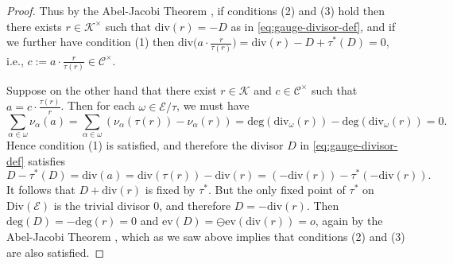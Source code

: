 \documentclass[preprint,12pt]{elsarticle}
\numberwithin{equation}{section} %
\theoremstyle{theorem}
\theoremstyle{definition}
\newcommand{\Ca}{\mathcal{C}} %
\newcommand{\bk}{\mathcal{K}} %
\newcommand{\ec}{\mathcal{E}} %
\newcommand{\idec}{{o}} %
\newcommand{\orbita}{{\ec/\tau}} %
\begin{document}
\begin{proof}
    Thus by the Abel-Jacobi Theorem \cite[Cor.~III.3.5]{SilvermanIntro}, if conditions (2) and (3) hold then there exists $r\in\bk^\times$ such that $\mathrm{div}(r)=-D$ as in \eqref{eq:gauge-divisor-def}, and if we further have condition (1) then $\mathrm{div}\bigl(a\cdot\frac{r}{\tau(r)}\bigr)=\mathrm{div}(r)-D+\tau^*(D)=0$, i.e., $c:=a\cdot\frac{r}{\tau(r)}\in\Ca^\times$.

    Suppose on the other hand that there exist $r\in\bk$ and $c\in\Ca^\times$ such that $a=c\cdot\frac{\tau(r)}{r}$. Then for each $\omega\in\orbita$, we must have \[\sum_{\alpha\in\omega}\nu_\alpha(a)=\sum_{\alpha\in\omega}(\nu_\alpha(\tau(r))-\nu_\alpha(r))=\mathrm{deg}(\mathrm{div}_\omega(r))-\mathrm{deg}(\mathrm{div}_\omega(r))=0.\] Hence condition (1) is satisfied, and therefore the divisor $D$ in \eqref{eq:gauge-divisor-def} satisfies \[D-\tau^*(D)=\mathrm{div}(a)=\mathrm{div}(\tau(r))-\mathrm{div}(r)=(-\mathrm{div}(r))-\tau^*(-\mathrm{div}(r)).\] It follows that $D+\mathrm{div}(r)$ is fixed by $\tau^*$. But the only fixed point of $\tau^*$ on $\mathrm{Div}(\ec)$ is the trivial divisor $0$, and therefore $D=-\mathrm{div}(r)$. Then $\mathrm{deg}(D)=-\mathrm{deg}(r)=0$ and $\mathrm{ev}(D)=\ominus\mathrm{ev}(\mathrm{div}(r))=\idec$, again by the Abel-Jacobi Theorem \cite[Cor.~III.3.5]{SilvermanIntro}, which as we saw above implies that conditions (2) and (3) are also satisfied. 
 \end{proof}
\end{document}
